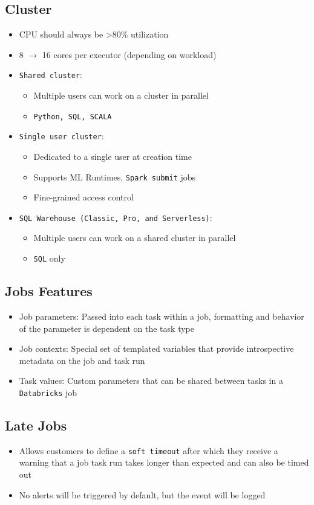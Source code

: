 \documentclass[11pt]{scrartcl}
\begin{document}
\subsection{Cluster}
\begin{itemize}
	\item CPU should always be >80\% utilization
	\item 8 $\to$ 16 cores per executor (depending on workload) 
	\item \texttt{Shared cluster}:
	\begin{itemize}
		\item Multiple users can work on a cluster in parallel
		\item \texttt{Python, SQL, SCALA}
	\end{itemize}
	\item \texttt{Single user cluster}:
	\begin{itemize}
		\item Dedicated to a single user at creation time
		\item Supports ML Runtimes, \texttt{Spark submit} jobs
		\item Fine-grained access control
	\end{itemize}
	\item \texttt{SQL Warehouse (Classic, Pro, and Serverless)}:
	\begin{itemize}
		\item Multiple users can work on a shared cluster in parallel
		\item \texttt{SQL} only
	\end{itemize}
\end{itemize}

\subsection{Jobs Features}
\begin{itemize}
	\item Job parameters: Passed into each task within a job, formatting and behavior of the parameter is dependent on the task type
	\item Job contexts: Special set of templated variables that provide introspective metadata on the job and task run
	\item Task values: Custom parameters that can be shared between tasks in a \texttt{Databricks} job
\end{itemize}

\subsection{Late Jobs}
\begin{itemize}
	\item Allows customers to define a \texttt{soft timeout} after which they receive a warning that a job task run takes longer than expected and can also be timed out
	\item No alerts will be triggered by default, but the event will be logged
\end{itemize}
\end{document}
